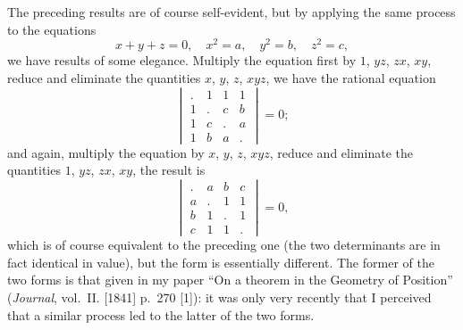 \documentclass[11pt,a4paper]{book}
\begin{document}
The preceding results are of course self-evident, but by applying the same process to the equations
\[
x + y + z = 0, \quad x^2 = a, \quad y^2 = b, \quad z^2 = c,
\]
we have results of some elegance. Multiply the equation first by $1$, $yz$, $zx$, $xy$, reduce and eliminate the quantities $x$, $y$, $z$, $xyz$, we have the rational equation
\[
\begin{vmatrix}
. & 1 & 1 & 1 \\
1 & . & c & b \\
1 & c & . & a \\
1 & b & a & .
\end{vmatrix} = 0;
\]
and again, multiply the equation by $x$, $y$, $z$, $xyz$, reduce and eliminate the quantities $1$, $yz$, $zx$, $xy$, the result is
\[
\begin{vmatrix}
. & a & b & c \\
a & . & 1 & 1 \\
b & 1 & . & 1 \\
c & 1 & 1 & .
\end{vmatrix} = 0,
\]
which is of course equivalent to the preceding one (the two determinants are in fact identical in value), but the form is essentially different. The former of the two forms is that given in my paper ``On a theorem in the Geometry of Position'' (\textit{Journal}, vol.~II. [1841] p.~270 [1]): it was only very recently that I perceived that a similar process led to the latter of the two forms.
\end{document}
